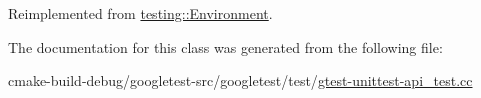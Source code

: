 Reimplemented from \mbox{\hyperlink{classtesting_1_1Environment_a039bdaa705c46b9b88234cf4d3bb6254}{testing\+::\+Environment}}.



The documentation for this class was generated from the following file\+:\begin{DoxyCompactItemize}
\item 
cmake-\/build-\/debug/googletest-\/src/googletest/test/\mbox{\hyperlink{gtest-unittest-api__test_8cc}{gtest-\/unittest-\/api\+\_\+test.\+cc}}\end{DoxyCompactItemize}
